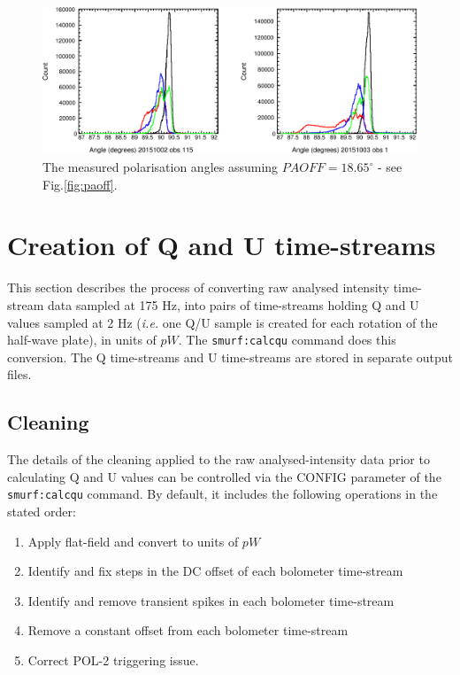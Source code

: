 \documentclass[twoside,11pt]{starlink}
\begin{document}
\begin{figure}
\includegraphics[width=\columnwidth]{paoff2}
\caption{The measured polarisation angles assuming $PAOFF=18.65^\circ$
- see Fig.\ref{fig:paoff}.}
\label{fig:paoff2}
\end{figure}

\section{Creation of  Q and U time-streams}

This section describes the process of converting raw analysed intensity
time-stream data sampled at 175 Hz, into pairs of time-streams holding  Q
and U values sampled at 2 Hz (\emph{i.e.} one Q/U sample is created for
each rotation of the half-wave plate), in units of $pW$. The \texttt{smurf:calcqu}
command does this conversion. The Q time-streams and U time-streams
are stored in separate output files.

\subsection{Cleaning}

The details of the cleaning applied to the raw analysed-intensity data prior
to calculating Q and U values can be controlled via the CONFIG parameter
of the \texttt{smurf:calcqu} command. By default, it includes the
following operations in the stated order:

\begin{enumerate}
\item Apply flat-field and convert to units of $pW$
\item Identify and fix steps in the DC offset of each bolometer time-stream
\item Identify and remove transient spikes in each  bolometer time-stream
\item Remove a constant offset from each bolometer time-stream
\item Correct POL-2 triggering issue.
\end{enumerate}
\end{document}
